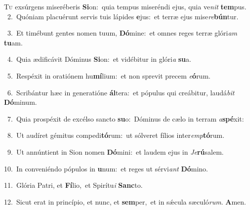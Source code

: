 \lettrine{\initial\textcolor{\initialcolor}{T}}{u} exsúrgens miseréberis \textbf{Si}\-on:~\star quia tempus miseréndi ejus, quia ve\textit{nit} \textbf{tem}\-pus.\\
{\numbfont\textcolor{\numbcolor}{~2.}}~Quóniam placuérunt servis tuis lápides \textbf{e}\-jus:~\star et terræ ejus mise\-\textit{re}\-\textbf{bún}tur.\par
{\numbfont\textcolor{\numbcolor}{~3.}}~Et timébunt gentes nomen tuum, \textbf{Dó}\-mine:~\star et omnes reges terræ glóri\textit{am} \textbf{tu}\-am.\par
{\numbfont\textcolor{\numbcolor}{~4.}}~Quia ædificávit Dóminus \textbf{Si}\-on:~\star et vidébitur in glóri\textit{a} \textbf{su}\-a.\par
{\numbfont\textcolor{\numbcolor}{~5.}}~Respéxit in oratiónem hu\-\textbf{mí}\-lium:~\star et non sprevit precem \textit{e}\-\textbf{ó}rum.\par
{\numbfont\textcolor{\numbcolor}{~6.}}~Scribántur hæc in generatióne \textbf{ál}\-tera:~\star et pópulus qui creábitur, laudá\textit{bit} \textbf{Dó}\-minum.\par
{\numbfont\textcolor{\numbcolor}{~7.}}~Quia prospéxit de excélso sancto \textbf{su}\-o:~\star Dóminus de cælo in terram \textit{a}\-\textbf{spé}xit:\par
{\numbfont\textcolor{\numbcolor}{~8.}}~Ut audíret gémitus compedi\-\textbf{tó}\-rum:~\star ut sólveret fílios inter\-\textit{emp}\-\textbf{tó}rum.\par
{\numbfont\textcolor{\numbcolor}{~9.}}~Ut annúntient in Sion nomen \textbf{Dó}\-mini:~\star et laudem ejus in \textit{Je}\-\textbf{rú}salem.\par
{\numbfont\textcolor{\numbcolor}{10.}}~In conveniéndo pópulos in \textbf{u}\-num:~\star et reges ut sérvi\textit{ant} \textbf{Dó}\-mino.\par
{\numbfont\textcolor{\numbcolor}{11.}}~Glória Patri, et \textbf{Fí}\-lio,~\star et Spirítu\textit{i} \textbf{Sanc}\-to.\par
{\numbfont\textcolor{\numbcolor}{12.}}~Sicut erat in princípio, et nunc, et \textbf{sem}\-per,~\star et in sǽcula sæculó\-\textit{rum}\-. \textbf{A}\-men.\par
